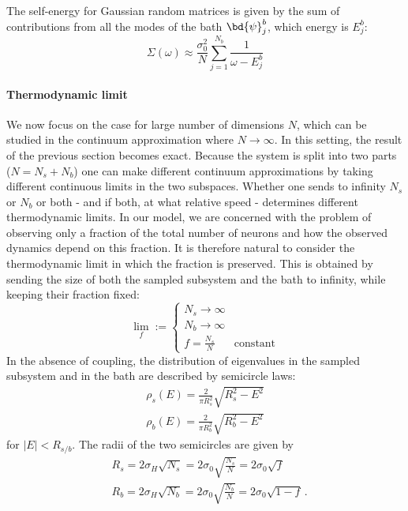 The self-energy for Gaussian random matrices is given by the sum of contributions from all the modes of the bath $\bd{\psi}_j^b$, which energy is $E_j^b$:
\begin{equation}
    \boxed{
    \Sigma(\omega) \approx \frac{\sigma_0^2}{N} \sum_{j=1}^{N_b} \frac{1}{\omega-E^b_j}
    }
    \label{eq:selfenergySum}
\end{equation}

\paragraph{Thermodynamic limit}
We now focus on the case for large number of dimensions $N$, which can be studied in the continuum approximation where $N\to\infty$. In this setting, the result of the previous section becomes exact.
Because the system is split into two parts ($N=N_s+N_b$) one can make different continuum approximations by taking different continuous limits in the two subspaces. Whether one sends to infinity $N_s$ or $N_b$ or both - and if both, at what relative speed - determines different thermodynamic limits.
In our model, we are concerned with the problem of observing only a fraction of the total number of neurons and how the observed dynamics depend on this fraction. It is therefore natural to consider the thermodynamic limit in which the fraction is preserved. This is obtained by sending the size of both the sampled subsystem and the bath to infinity, while keeping their fraction fixed:
\begin{equation}
    \lim_f :=
    \begin{cases}
        N_s \to \infty \\
        N_b \to \infty \\
        f = \frac{N_s}{N} & \text{constant}
    \end{cases}
    \label{eq:samplingFraction}
\end{equation}
In the absence of coupling, the distribution of eigenvalues in the sampled subsystem and in the bath are described by semicircle laws:
\begin{align}
    \rho_s(E) = \frac{2}{ \pi R_s^2}\sqrt{R_s^2 -E^2} \\
    \rho_b(E) = \frac{2}{ \pi R_b^2}\sqrt{R_b^2 -E^2}
    \label{eq:semicircle_laws_subs}
\end{align}
for $|E|<R_{s/b}$.
The radii of the two semicircles are given by
\begin{align}
    & R_s =  2 \sigma_H\sqrt{N_s} =
     2 \sigma_0\sqrt{\frac{N_s}{N}} =
    2 \sigma_0 \sqrt{f} \\
    & R_b =
     2 \sigma_H\sqrt{N_b} =
     2 \sigma_0\sqrt{\frac{N_b}{N}} =
    2 \sigma_0 \sqrt{1-f} \,.
\end{align}

